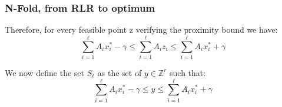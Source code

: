 \documentclass{beamer}
\begin{document}
    \begin{frame}
        \frametitle{N-Fold, from RLR to optimum}
        Therefore, for every feasible point z verifying the proximity bound we have:
        \begin{equation*}
            \sum_{i=1}^\ell A_ix_i^* - \gamma \leq \sum_{i=1}^\ell A_iz_i \leq \sum_{i=1}^\ell A_ix_i^* + \gamma 
        \end{equation*}
        
        We now define the set $S_\ell$ as the set of $y \in \mathbb{Z}^r$ such that:
        \begin{equation*}
        \sum_{i=1}^\ell A_ix_i^* - \gamma \leq y \leq \sum_{i=1}^\ell A_ix_i^* + \gamma 
        \end{equation*}
        
        
        
        
        
    \end{frame}
\end{document}
